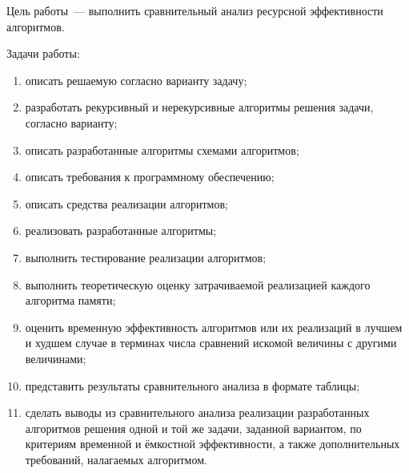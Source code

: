 
Цель работы~--- выполнить сравнительный анализ ресурсной эффективности алгоритмов.

Задачи работы:
\begin{enumerate}
	\item описать решаемую согласно варианту задачу;
	\item разработать рекурсивный и нерекурсивные алгоритмы решения задачи, согласно варианту;
	\item описать разработанные алгоритмы схемами алгоритмов;
	\item описать требования к программному обеспечению;
	\item описать средства реализации алгоритмов;
	\item реализовать разработанные алгоритмы;
	\item выполнить тестирование реализации алгоритмов;
	\item выполнить теоретическую оценку затрачиваемой реализацией каждого алгоритма памяти;
	\item оценить временную эффективность алгоритмов или их реализаций в лучшем и худшем случае в терминах числа сравнений искомой величины с другими величинами;
	\item представить результаты сравнительного анализа в формате таблицы;
	\item сделать выводы из сравнительного анализа реализации разработанных алгоритмов решения одной и той же задачи, заданной вариантом, по критериям временной и ёмкостной эффективности, а также дополнительных требований, налагаемых алгоритмом.
\end{enumerate}
